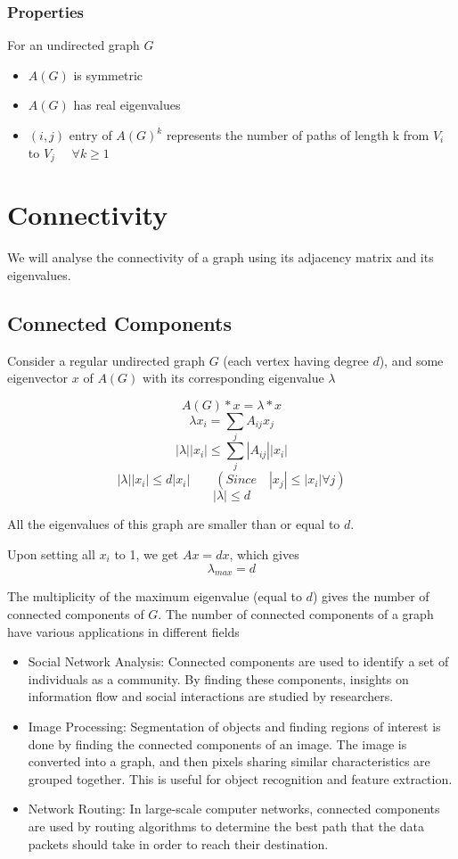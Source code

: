 \documentclass[12pt, a4paper]{article}
\begin{document}
        \subsubsection{Properties}
        For an undirected graph $G$
        \begin{itemize}
          \item $A(G)$ is symmetric 
          \item $A(G)$ has real eigenvalues
          \item $(i,j)$ entry of $A(G)^k$ represents the number of paths of length k from $V_i$ to $V_j$ $\quad \forall k \ge 1$
        \end{itemize}

    \section{Connectivity}
    We will analyse the connectivity of a graph using its adjacency matrix and its eigenvalues.

    \subsection{Connected Components}
    \begin{flushleft}
    Consider a regular undirected graph $G$ (each vertex having degree $d$), and some eigenvector $x$ of $A(G)$ with its corresponding eigenvalue $\lambda$

    $$A(G)*x = \lambda*x$$
    $$\lambda x_i = \sum_{j} A_{ij}x_j$$
    $$|\lambda||x_i| \le \sum_{j} |A_{ij}||x_i|$$
    $$ |\lambda||x_i| \le d|x_i| \qquad (Since \quad |x_j| \le |x_i| \forall j)$$
    $$|\lambda| \le d$$

    All the eigenvalues of this graph are smaller than or equal to $d$.

    Upon setting all $x_i$ to 1, we get $Ax = dx$, which gives
    $$\lambda_{max} = d$$

  The multiplicity of the maximum eigenvalue (equal to $d$) gives the number of connected components of $G$. The number of connected components of a graph have various applications in different fields

      \begin{itemize}
        \item Social Network Analysis: Connected components are used to identify a set of individuals as a community. By finding these components, insights on information flow and social interactions are studied by researchers.
        \item Image Processing: Segmentation of objects and finding regions of interest is done by finding the connected components of an image. The image is converted into a graph, and then pixels sharing similar characteristics are grouped together. This is useful for object recognition and feature extraction.

        \item Network Routing: In large-scale computer networks, connected components are used by routing algorithms to determine the best path that the data packets should take in order to reach their destination.
      \end{itemize}
    \end{flushleft}
\end{document}
